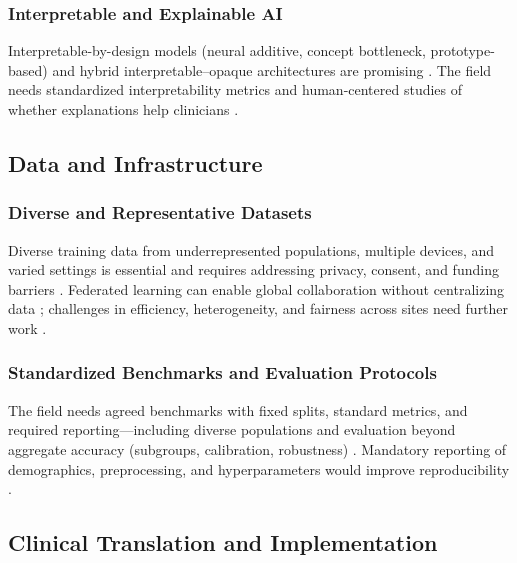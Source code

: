\subsubsection{Interpretable and Explainable AI}

Interpretable-by-design models (neural additive, concept bottleneck, prototype-based) and hybrid interpretable–opaque architectures are promising \cite{alam2024machine, bhati2024interpretable, zhu2021deep}. The field needs standardized interpretability metrics and human-centered studies of whether explanations help clinicians \cite{mackenzie2023diabetes, jacobs2023artificial}.

\subsection{Data and Infrastructure}

\subsubsection{Diverse and Representative Datasets}

Diverse training data from underrepresented populations, multiple devices, and varied settings is essential \cite{wang2024ai, prioleau2025deep, bai2024federated} and requires addressing privacy, consent, and funding barriers \cite{mackenzie2023diabetes}. Federated learning can enable global collaboration without centralizing data \cite{bai2024federated, fahmy2025exploring, raj2024federated}; challenges in efficiency, heterogeneity, and fairness across sites need further work \cite{fahmy2025exploring}.

\subsubsection{Standardized Benchmarks and Evaluation Protocols}

The field needs agreed benchmarks with fixed splits, standard metrics, and required reporting—including diverse populations and evaluation beyond aggregate accuracy (subgroups, calibration, robustness) \cite{prioleau2025deep, jacobs2023artificial, wang2024ai}. Mandatory reporting of demographics, preprocessing, and hyperparameters would improve reproducibility \cite{prioleau2025deep}.

\subsection{Clinical Translation and Implementation}

